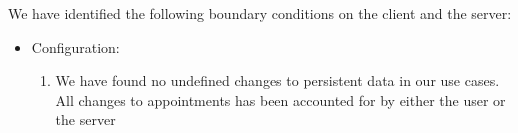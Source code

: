 We have identified the following boundary conditions on the client and the server:


\begin{itemize}
	\item Configuration:
	\begin{enumerate}
		\item We have found no undefined changes to persistent data in our use cases. All changes to appointments has been accounted for by either the user or the server
	\end{enumerate}
\end{itemize}